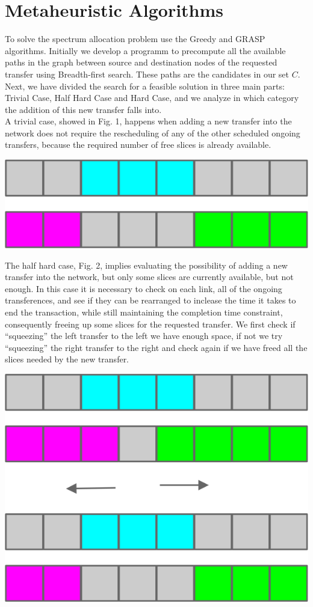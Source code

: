 \documentclass[11pt,a4paper]{article}
\begin{document}
\section{Metaheuristic Algorithms}

To solve the spectrum allocation problem use the Greedy and GRASP algorithms. Initially we develop a programm to precompute all the available paths in the graph between source and destination nodes of the requested transfer using Breadth-first search. These paths are the candidates in our set $C$. Next, we have divided the search for a feasible solution in three main parts: Trivial Case, Half Hard Case and Hard Case, and we analyze in which category the addition of this new transfer falls into.\\

A trivial case, showed in Fig. 1, happens when adding a new transfer into the network does not require the rescheduling of any of the other scheduled ongoing transfers, because the required number of free slices is already available.

\includegraphics[scale=1]{trivialcase.jpg}

The half hard case, Fig. 2, implies evaluating the possibility of adding a new transfer into the network, but only some slices are currently available, but not enough. In this case it is necessary to check on each link, all of the ongoing transferences, and see if they can be rearranged to inclease the time it takes to end the transaction, while still maintaining the completion time constraint, consequently freeing up some slices for the requested transfer. We first check if “squeezing” the left transfer to the left we have enough space, if not we try “squeezing” the right transfer to the right and check again if we have freed all the slices needed by the new transfer. 

\includegraphics[scale=1]{halfhardcase.jpg}
\end{document}
